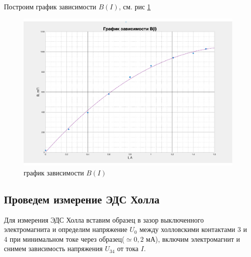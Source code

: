 \documentclass[a4paper,14pt]{article}
\begin{document}
Построим график зависимости $B(I)$, см. рис \ref{gr1}

\begin{center}
	\begin{figure}[bhtp!]
		\centering
		\includegraphics[width=0.8\linewidth]{gr1.pdf}
		\caption{график зависимости $B(I)$}
		\label{gr1}
	\end{figure}
\end{center}

\subsection*{Проведем измерение ЭДС Холла}

Для измерения ЭДС Холла вставим образец в зазор выключенного электромагнита и определим напряжение $U_0$ между холловскими контактами 3 и 4 при минимальном токе через образец($\simeq0,2 $ мА), включим электромагнит  и снимем зависимость напряжения $U_{34}$ от тока $I$.
\end{document}
